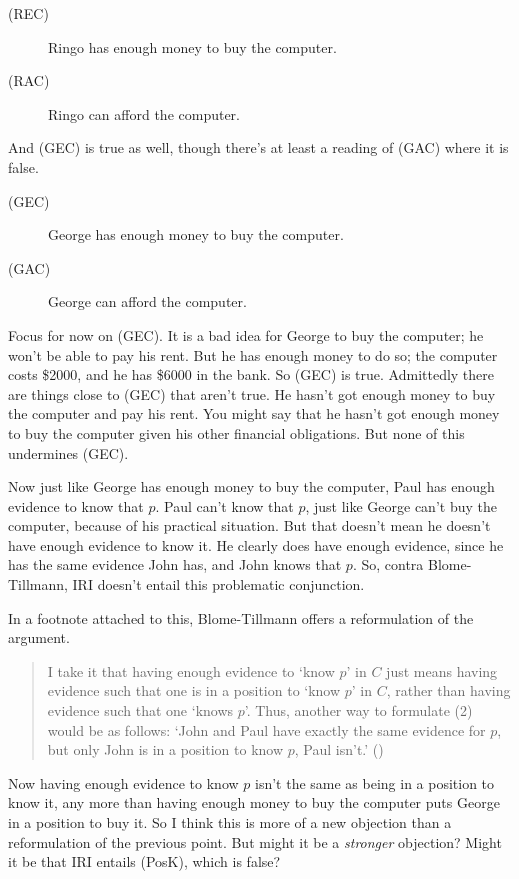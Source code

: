 \documentclass[
  11pt,
  letterpaper,
  DIV=11,
  numbers=noendperiod,
  oneside]{scrartcl}
\begin{document}
\begin{description}
\item[(REC)]
Ringo has enough money to buy the computer.
\item[(RAC)]
Ringo can afford the computer.
\end{description}

And (GEC) is true as well, though there's at least a reading of (GAC)
where it is false.

\begin{description}
\item[(GEC)]
George has enough money to buy the computer.
\item[(GAC)]
George can afford the computer.
\end{description}

Focus for now on (GEC). It is a bad idea for George to buy the computer;
he won't be able to pay his rent. But he has enough money to do so; the
computer costs \$2000, and he has \$6000 in the bank. So (GEC) is true.
Admittedly there are things close to (GEC) that aren't true. He hasn't
got enough money to buy the computer and pay his rent. You might say
that he hasn't got enough money to buy the computer given his other
financial obligations. But none of this undermines (GEC).

Now just like George has enough money to buy the computer, Paul has
enough evidence to know that \(p\). Paul can't know that \(p\), just
like George can't buy the computer, because of his practical situation.
But that doesn't mean he doesn't have enough evidence to know it. He
clearly does have enough evidence, since he has the same evidence John
has, and John knows that \(p\). So, contra Blome-Tillmann, IRI doesn't
entail this problematic conjunction.

In a footnote attached to this, Blome-Tillmann offers a reformulation of
the argument.

\begin{quote}
I take it that having enough evidence to `know \(p\)' in \(C\) just
means having evidence such that one is in a position to `know \(p\)' in
\(C\), rather than having evidence such that one `knows \(p\)'. Thus,
another way to formulate (2) would be as follows: `John and Paul have
exactly the same evidence for \(p\), but only John is in a position to
know \(p\), Paul isn't.' ()
\end{quote}

Now having enough evidence to know \(p\) isn't the same as being in a
position to know it, any more than having enough money to buy the
computer puts George in a position to buy it. So I think this is more of
a new objection than a reformulation of the previous point. But might it
be a \emph{stronger} objection? Might it be that IRI entails (PosK),
which is false?
\end{document}
